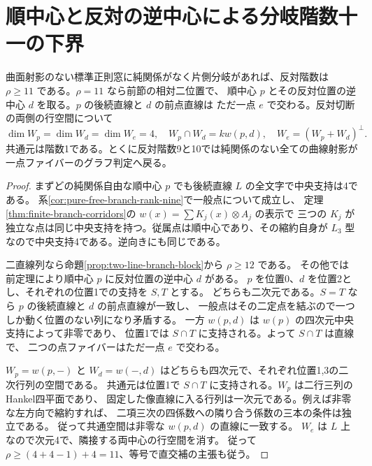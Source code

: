\section{順中心と反対の逆中心による分岐階数十一の下界}
\label{sec:branch-rank-eleven-floor}
\begin{theorem}\label{thm:branch-rank-eleven-floor}
曲面射影のない標準正則窓に純関係がなく片側分岐があれば、反対階数は
$\rho\ge11$ である。$\rho=11$ なら前節の相対二位置で、
順中心 $p$ とその反対位置の逆中心 $d$ を取る。$p$ の後続直線と $d$ の前点直線は
ただ一点 $e$ で交わる。反対切断の両側の行空間について
\[
 \dim W_p=\dim W_d=\dim W_e=4,\quad
 W_p\cap W_d=k w(p,d),\quad W_e=(W_p+W_d)^\perp .
\]
共通元は階数1である。とくに反対階数9と10では純関係のない全ての曲線射影が
一点ファイバーのグラフ判定へ戻る。
\end{theorem}
\begin{proof}
まずどの純関係自由な順中心 $p$ でも後続直線 $L$ の全文字で中央支持は4である。
系\ref{cor:pure-free-branch-rank-nine}で一般点について成立し、
定理\ref{thm:finite-branch-corridors}の $w(x)=\sum K_j(x)\otimes A_j$ の表示で
三つの $K_j$ が独立な点は同じ中央支持を持つ。従属点は順中心であり、その縮約自身が
$L_3$ 型なので中央支持4である。逆向きにも同じである。

二直線列なら命題\ref{prop:two-line-branch-block}から $\rho\ge12$ である。
その他では前定理により順中心 $p$ に反対位置の逆中心 $d$ がある。
$p$ を位置0、$d$ を位置2とし、それぞれの位置1での支持を $S,T$ とする。
どちらも二次元である。$S=T$ なら $p$ の後続直線と $d$ の前点直線が一致し、
一般点はその二定点を結ぶので一つしか動く位置のない列になり矛盾する。
一方 $w(p,d)$ は $w(p)$ の四次元中央支持によって非零であり、
位置1では $S\cap T$ に支持される。よって $S\cap T$ は直線で、
二つの点ファイバーはただ一点 $e$ で交わる。

$W_p=w(p,-)$ と $W_d=w(-,d)$ はどちらも四次元で、それぞれ位置1,3の二次行列の空間である。
共通元は位置1で $S\cap T$ に支持される。$W_p$ は二行三列のHankel四平面であり、
固定した像直線に入る行列は一次元である。例えば非零な左方向で縮約すれば、
二項三次の四係数への隣り合う係数の三本の条件は独立である。
従って共通空間は非零な $w(p,d)$ の直線に一致する。
$W_e$ は $L$ 上なので次元4で、隣接する両中心の行空間を消す。
従って $\rho\ge(4+4-1)+4=11$、等号で直交補の主張も従う。
\end{proof}

